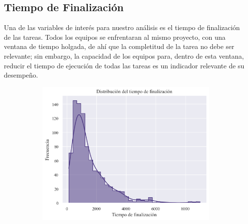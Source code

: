 \documentclass[a4paper, 12pt]{article}
\begin{document}
\subsection{Tiempo de Finalización}
	Una de las variables de interés para nuestro análisis es el tiempo de finalización de las tareas. Todos los equipos se enfrentaran al mismo proyecto, con una ventana de tiempo holgada, de ahí que la completitud de la tarea no debe ser relevante; sin embargo, la capacidad de los equipos para, dentro de esta ventana, reducir el tiempo de ejecución de todas las tareas es un indicador relevante de su desempeño.
	\begin{figure}[htb!]
		\centering
		\begin{subfigure}{.45\linewidth}
			\includegraphics[height=.95\linewidth, width=.95\linewidth]{assets/time_dist}
			\caption{}
			\label{fig:1a}
		\end{subfigure}
		\begin{subfigure}{.45\linewidth}

\end{subfigure}
\end{figure}
\end{document}
